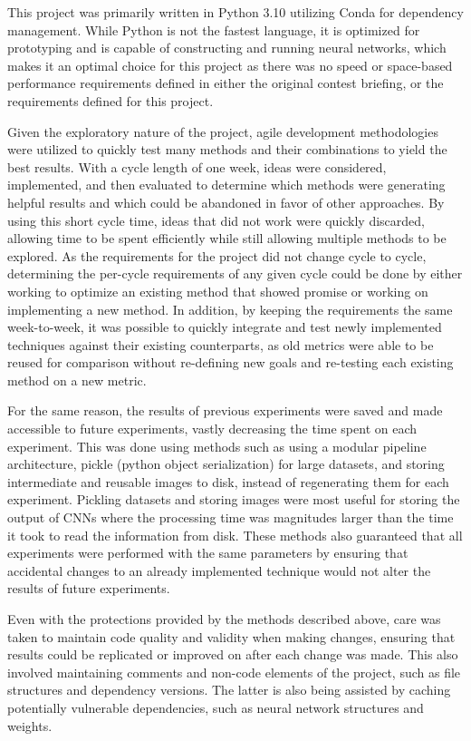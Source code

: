 This project was primarily written in Python 3.10 utilizing Conda for dependency management. While Python is not the fastest language, it is optimized for prototyping and is capable of constructing and running neural networks, which makes it an optimal choice for this project as there was no speed or space-based performance requirements defined in either the original contest briefing, or the requirements defined for this project.

Given the exploratory nature of the project, agile development methodologies were utilized to quickly test many methods and their combinations to yield the best results. With a cycle length of one week, ideas were considered, implemented, and then evaluated to determine which methods were generating helpful results and which could be abandoned in favor of other approaches. By using this short cycle time, ideas that did not work were quickly discarded, allowing time to be spent efficiently while still allowing multiple methods to be explored. As the requirements for the project did not change cycle to cycle, determining the per-cycle requirements of any given cycle could be done by either working to optimize an existing method that showed promise or working on implementing a new method. In addition, by keeping the requirements the same week-to-week, it was possible to quickly integrate and test newly implemented techniques against their existing counterparts, as old metrics were able to be reused for comparison without re-defining new goals and re-testing each existing method on a new metric.

For the same reason, the results of previous experiments were saved and made accessible to future experiments, vastly decreasing the time spent on each experiment. This was done using methods such as using a modular pipeline architecture, pickle \cite{pickle} (python object serialization) for large datasets, and storing intermediate and reusable images to disk, instead of regenerating them for each experiment. Pickling datasets and storing images were most useful for storing the output of CNNs where the processing time was magnitudes larger than the time it took to read the information from disk. These methods also guaranteed that all experiments were performed with the same parameters by ensuring that accidental changes to an already implemented technique would not alter the results of future experiments.

Even with the protections provided by the methods described above, care was taken to maintain code quality and validity when making changes, ensuring that results could be replicated or improved on after each change was made. This also involved maintaining comments and non-code elements of the project, such as file structures and dependency versions. The latter is also being assisted by caching potentially vulnerable dependencies, such as neural network structures and weights.
